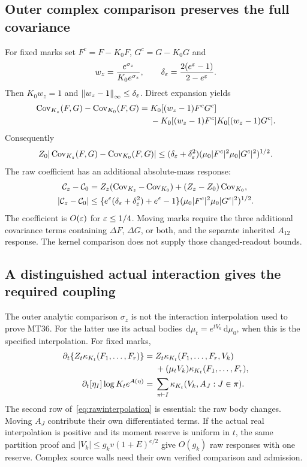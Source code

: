 \documentclass[11pt,letterpaper]{article}
\theoremstyle{plain}
\theoremstyle{remark}\newtheorem{remark}[theorem]{Scope}
\newcommand{\dd}{\,\mathrm d}\newcommand{\OH}{\mathcal O_H}
\newcommand{\norm}[1]{\left\lVert#1\right\rVert}
\begin{document}
\subsection{Outer complex comparison preserves the full covariance}

For fixed marks set $F^c=F-K_0F$, $G^c=G-K_0G$ and
\begin{equation}
w_z=\frac{e^{\sigma_z}}{K_0e^{\sigma_z}},\qquad
\delta_\varepsilon=\frac{2(e^\varepsilon-1)}{2-e^\varepsilon}.
\end{equation}
Then $K_0w_z=1$ and $\norm{w_z-1}_\infty\le\delta_\eps$.
Direct expansion yields
\begin{align}
\operatorname{Cov}_{K_z}(F,G)-\operatorname{Cov}_{K_0}(F,G)
={}&K_0[(w_z-1)F^cG^c]\notag\\
&-K_0[(w_z-1)F^c]K_0[(w_z-1)G^c].
\label{eq:covdifference}
\end{align}
Consequently
\begin{equation}
Z_0|\operatorname{Cov}_{K_z}(F,G)-\operatorname{Cov}_{K_0}(F,G)|
\le(\delta_\varepsilon+\delta_\varepsilon^2)
(\mu_0|F^c|^2\mu_0|G^c|^2)^{1/2}.
\label{eq:covdifferencebound}
\end{equation}
The raw coefficient has an additional absolute-mass response:
\begin{align}
\mathcal C_z-\mathcal C_0
={}&Z_z(\operatorname{Cov}_{K_z}-\operatorname{Cov}_{K_0})
+(Z_z-Z_0)\operatorname{Cov}_{K_0},\notag\\
|\mathcal C_z-\mathcal C_0|
\le{}&\{e^\varepsilon(\delta_\varepsilon+\delta_\varepsilon^2)+e^\varepsilon-1\}
(\mu_0|F^c|^2\mu_0|G^c|^2)^{1/2}.
\label{eq:rawdifference}
\end{align}
The coefficient is $O(\varepsilon)$ for $\varepsilon\le1/4$. Moving marks require the
three additional covariance terms containing $\Delta F$, $\Delta G$, or
both, and the separate inherited $A_{12}$ response. The kernel comparison
does not supply those changed-readout bounds.

\subsection{A distinguished actual interaction gives the required coupling}

The outer analytic comparison $\sigma_z$ is not the interaction interpolation
used to prove MT36. For the latter use its actual bodies
$\dd\mu_t=e^{tV_k}\dd\mu_0$, when this is the specified interpolation.
For fixed marks,
\begin{align}
\partial_t\{Z_t\kappa_{K_t}(F_1,\ldots,F_r)\}
={}&Z_t\kappa_{K_t}(F_1,\ldots,F_r,V_k)\notag\\
&+(\mu_tV_k)\kappa_{K_t}(F_1,\ldots,F_r),
\label{eq:rawinterpolation}\\
\partial_t[\eta_I]\log K_te^{A(\eta)}
={}&\sum_{\pi\vdash I}\kappa_{K_t}(V_k,A_J:J\in\pi).
\label{eq:sourceinterpolation}
\end{align}
The second row of~\eqref{eq:rawinterpolation} is essential: the raw body
changes. Moving $A_J$ contribute their own differentiated terms.
If the actual real interpolation is positive and its moment reserve is
uniform in $t$, the same partition proof and
$|V_k|\le g_kv(1+E)^{e/2}$ give $O(g_k)$ raw responses with one reserve.
Complex source walls need their own verified comparison and admission.
\end{document}
